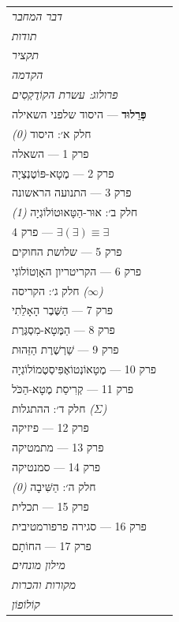 \documentclass[10pt, openany, oneside]{book}
\renewcommand{\small}{\fontsize{9}{11.5}\selectfont}
\begin{document}
{\small
\noindent\begin{tabular}{@{} l @{\hspace{1em}} r @{}}
\textit{דבר המחבר} & \\
\textit{תודות} & \\
\textit{תקציר} & \\
\textit{הקדמה} & \\
\textit{פרולוג: עשרת הקוֹדֶקְסִים} & \\[0.5em]
\textbf{פְּרֵלוּד} --- היסוד שלפני השאילה & \\[0.8em]

\textsc{חלק א׳: היסוד} \textit{(0)} & \\[0.3em]
\quad פרק 1 --- השאלה & \\
\quad פרק 2 --- מֶטָא-פּוֹטֶנְצְיָה & \\
\quad פרק 3 --- התנועה הראשונה & \\[0.8em]

\textsc{חלק ב׳: אוּר-הַטָּאוּטוֹלוֹגְיָה} \textit{(1)} & \\[0.3em]
\quad פרק 4 --- $\exists(\exists) \equiv \exists$ & \\
\quad פרק 5 --- שלושת החוקים & \\
\quad פרק 6 --- הקריטריון האָוְטוֹלוֹגִי & \\[0.8em]

\textsc{חלק ג׳: הקריסה} \textit{($\infty$)} & \\[0.3em]
\quad פרק 7 --- הַשֶּׁבֶר הָאָלֵתִי & \\
\quad פרק 8 --- הַמֶּטָא-מִסְגֶּרֶת & \\
\quad פרק 9 --- שַׁרְשֶׁרֶת הַזֵּהוּת & \\
\quad פרק 10 --- מֶטָאוֹנְטוֹאֶפִּיסְטֶמוֹלוֹגְיָה & \\
\quad פרק 11 --- קְרִיסַת מֶטָא-הַכֹּל & \\[0.8em]

\textsc{חלק ד׳: ההתגלות} \textit{($\Sigma$)} & \\[0.3em]
\quad פרק 12 --- פיזיקה & \\
\quad פרק 13 --- מתמטיקה & \\
\quad פרק 14 --- סמנטיקה & \\[0.8em]

\textsc{חלק ה׳: הַשִּׁיבָה} \textit{(0)} & \\[0.3em]
\quad פרק 15 --- תכלית & \\
\quad פרק 16 --- סגירה פרפורמטיבית & \\
\quad פרק 17 --- החוֹתָם & \\[0.8em]

\textit{מילון מונחים} & \\
\textit{מקורות והכרות} & \\
\textit{קוֹלוֹפוֹן} & \\
\end{tabular}
}
\end{document}

